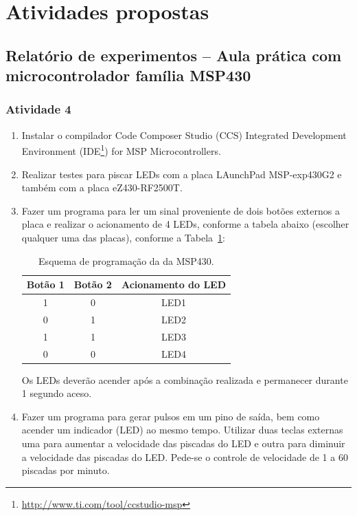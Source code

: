 \documentclass[
	12pt,				%
	openright,			%
  oneside,     %
	a4paper,			%
	english,			%
	french,				%
	spanish,			%
	brazil				%
	]{abntex2}
\begin{document}
\section{Atividades propostas} %
\label{cha:MSP430-sec:atividades_propostas}

\subsection*{Relatório de experimentos – Aula prática com microcontrolador família MSP430}

\subsubsection*{Atividade 4}

\begin{enumerate}
  \item Instalar o compilador Code Composer Studio (CCS) Integrated Development Environment (IDE\footnote{\url{http://www.ti.com/tool/ccstudio-msp}}) for MSP Microcontrollers.
  \item Realizar testes para piscar LEDs com a placa LAunchPad MSP-exp430G2 e também com a placa eZ430-RF2500T.
  \item Fazer um programa para ler um sinal proveniente de dois botões externos a placa e realizar o acionamento de 4 LEDs, conforme a tabela abaixo (escolher qualquer uma das placas), conforme a Tabela~\ref{Table:MSP430}:
  \begin{table}[h]
    \centering
    \caption{\label{Table:MSP430}Esquema de programação da da MSP430.}
    \begin{tabular}{ccc}
    \hline
    {\textbf{Botão 1}} & {\textbf{Botão 2}} & {\textbf{Acionamento do LED}} \\ \hline
    1             & 0             & LED1                     \\
    0             & 1             & LED2                     \\
    1             & 1             & LED3                     \\
    0             & 0             & LED4                     \\ \hline
    \end{tabular}
  \end{table}

    Os LEDs deverão acender após a combinação realizada e permanecer durante 1 segundo aceso.

  \item Fazer um programa para gerar pulsos em um pino de saída, bem como acender um indicador (LED) ao mesmo tempo. Utilizar duas teclas externas uma para aumentar a velocidade das piscadas do LED e outra para diminuir a velocidade das piscadas do LED. Pede-se o controle de velocidade de 1 a 60 piscadas por minuto.
\end{enumerate}
\end{document}
